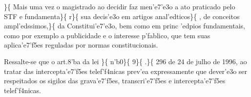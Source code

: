  \ltrch{}  \par \}\{\rtlch{}  \ltrch{}
 Mais uma vez o magistrado ao decidir
faz men'e7'e3o a ato praticado pelo STF e fundamenta\}\{\rtlch{} 
\ltrch{}  r\}\{\rtlch{}  \ltrch{}
 sua decis'e3o em artigos
anal'edticos\}\{\rtlch{}  \ltrch{}  , de
conceitos ampl'edssimos,\}\{\rtlch{}  \ltrch{}
 da Constitui'e7'e3o, bem como em princ
'edpios fundamentais, como por exemplo a publicidade e o interesse
p'fablico, que tem suas aplica'e7'f5es reguladas por normas
constitucionais. \par Ressalte-se que o art.8'ba da lei \}\{\rtlch{}
 \ltrch{}  n'b0\}\{\rtlch{}  \ltrch{}
 9\}\{\rtlch{}  \ltrch{}
 .\}\{\rtlch{}  \ltrch{}
 296 de 24 de julho de 1996, ao tratar
das intercepta'e7'f5es telef'f4nicas prev'ea expressamente que dever'e3o
ser respeitados os sigilos das grava'e7'f5es, transcri'e7'f5es e
intercepta'e7'f5es telef'f4nicas.

\par 

